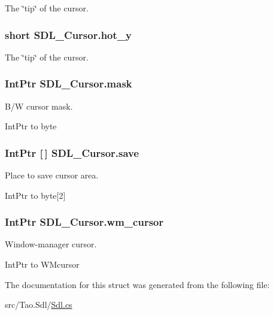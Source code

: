 The \char`\"{}tip\char`\"{} of the cursor. 

\hypertarget{struct_s_d_l___cursor_a51d8ba9577125e5d518837818ee9bca9}{
\subsubsection[{hot\_\-y}]{\setlength{\rightskip}{0pt plus 5cm}short {\bf SDL\_\-Cursor.hot\_\-y}}}
\label{struct_s_d_l___cursor_a51d8ba9577125e5d518837818ee9bca9}


The \char`\"{}tip\char`\"{} of the cursor. 

\hypertarget{struct_s_d_l___cursor_a5d45f0dcdc1ba18988a3b724b153747c}{
\subsubsection[{mask}]{\setlength{\rightskip}{0pt plus 5cm}IntPtr {\bf SDL\_\-Cursor.mask}}}
\label{struct_s_d_l___cursor_a5d45f0dcdc1ba18988a3b724b153747c}


B/W cursor mask. 

IntPtr to byte \hypertarget{struct_s_d_l___cursor_ad801b2ec405fd1d6f358e44db3e116ac}{
\subsubsection[{save}]{\setlength{\rightskip}{0pt plus 5cm}IntPtr \mbox{[}$\,$\mbox{]} {\bf SDL\_\-Cursor.save}}}
\label{struct_s_d_l___cursor_ad801b2ec405fd1d6f358e44db3e116ac}


Place to save cursor area. 

IntPtr to byte\mbox{[}2\mbox{]} \hypertarget{struct_s_d_l___cursor_ab57675a1865a273bef376f8697538414}{
\subsubsection[{wm\_\-cursor}]{\setlength{\rightskip}{0pt plus 5cm}IntPtr {\bf SDL\_\-Cursor.wm\_\-cursor}}}
\label{struct_s_d_l___cursor_ab57675a1865a273bef376f8697538414}


Window-\/manager cursor. 

IntPtr to WMcursor 

The documentation for this struct was generated from the following file:\begin{DoxyCompactItemize}
\item 
src/Tao.Sdl/\hyperlink{_sdl_8cs}{Sdl.cs}\end{DoxyCompactItemize}
